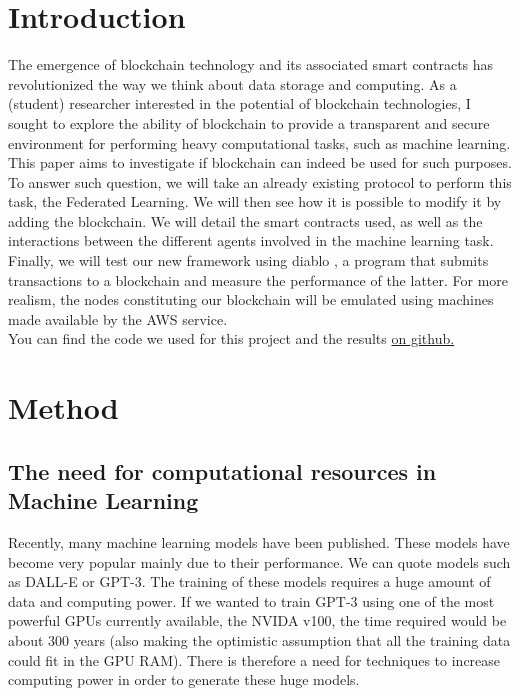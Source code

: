 \documentclass{article}
\begin{document}
\section{Introduction}
The emergence of blockchain technology and its associated smart contracts has revolutionized the way we think about data
storage and computing. As a (student) researcher interested in the potential of blockchain technologies, I sought to explore the
ability of blockchain to provide a transparent and secure environment for performing heavy computational tasks, such
as machine learning. This paper aims to investigate if blockchain can indeed be used for such purposes.
To answer such question, we will take an already existing protocol to perform this task, the Federated Learning. We will then see how it is possible to modify it by adding the blockchain.
We will detail the smart contracts used, as well as the interactions between the different agents involved in the
machine learning task. Finally, we will test our new framework using diablo \cite{diablo}, a program that submits transactions
to a blockchain and measure the performance of the latter. For more realism,
the nodes constituting our blockchain will be emulated using machines made available by the AWS service.\\
You can find the code we used for this project and the results \href{https://github.com/douglasbouchet/ml_on_blockchain}{on github.}
\section{Method}
\subsection{The need for computational resources in Machine Learning}
Recently, many machine learning models have been published. These models have become very popular mainly due to their
performance. We can quote models such as DALL-E or GPT-3. The training of these models requires a huge amount of data
and computing power. If we wanted to train GPT-3 using one of the most powerful GPUs currently available,
the NVIDA v100, the time required would be about 300 years (also making the optimistic assumption that all the
training data could fit in the GPU RAM). There is therefore a need for techniques to increase computing power in order
to generate these huge models.
\end{document}

